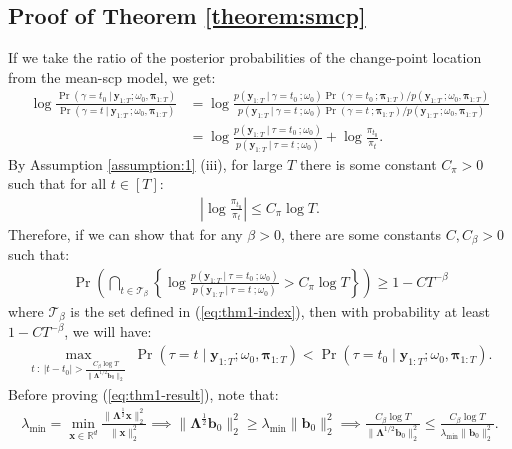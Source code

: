 \subsection{Proof of Theorem \ref{theorem:smcp}}
\label{app:localization-smcp}

If we take the ratio of the posterior probabilities of the change-point location from the mean-scp model, we get:
\begin{align*}
    \log \frac{\Pr(\gamma = t_0  \:|\: \mathbf{y}_{1:T} ; \omega_0,\boldsymbol{\pi}_{1:T})}{\Pr(\gamma = t  \:|\: \mathbf{y}_{1:T} \:; \omega_0,\boldsymbol{\pi}_{1:T})} &=  \log \frac{p(\mathbf{y}_{1:T} \:|\:\gamma = t_0 \:; \omega_0)\Pr(\gamma = t_0 \:; \boldsymbol{\pi}_{1:T})/ p(\mathbf{y}_{1:T}\:;\omega_0,\boldsymbol{\pi}_{1:T})}{p(\mathbf{y}_{1:T} \:|\:\gamma = t \:; \omega_0)\Pr(\gamma = t \:;\boldsymbol{\pi}_{1:T})/p(\mathbf{y}_{1:T}\:;\omega_0,\boldsymbol{\pi}_{1:T})} \tag{Bayes' rule} \\
    &= \log \frac{p(\mathbf{y}_{1:T} \:|\:\tau = t_0 \:; \omega_0)}{p(\mathbf{y}_{1:T} \:|\:\tau = t \:; \omega_0)} + \log \frac{\pi_{t_0}}{\pi_t}.
\end{align*}
By Assumption \ref{assumption:1} (iii), for large $T$ there is some constant $C_\pi > 0$ such that for all $t \in [T]$: 
\begin{align}\label{eq:thm1-prior-bd}
    \left|\log \frac{\pi_{t_0}}{\pi_t}\right| \leq C_\pi \log T.
\end{align}
Therefore, if we can show that for any $\beta > 0$, there are some constants $C,C_\beta > 0$ such that:
\begin{align}
    \Pr\left(\bigcap_{t\in\mathcal{T}_\beta}\left\{ \log \frac{p(\mathbf{y}_{1:T} \:|\:\tau = t_0 \:; \omega_0)}{p(\mathbf{y}_{1:T} \:|\:\tau = t \:; \omega_0)} > C_\pi \log T\right\}\right) \geq 1 - CT^{-\beta} \label{eq:thm1-result}
\end{align}
where $\mathcal{T}_\beta$ is the set defined in (\ref{eq:thm1-index}), then with probability at least $1 - CT^{-\beta}$, we will have:
\begin{align*}
    \max_{t\::\: |t - t_0| > \frac{C_\beta\log T}{\lVert\boldsymbol{\Lambda}^{1/2}\mathbf{b}_0\rVert_2}} \; \Pr(\tau = t  \;|\; \mathbf{y}_{1:T} ; \omega_0,\boldsymbol{\pi}_{1:T}) < \Pr(\tau = t_0  \;|\; \mathbf{y}_{1:T} ; \omega_0,\boldsymbol{\pi}_{1:T}).
\end{align*}
Before proving (\ref{eq:thm1-result}), note that: 
\begin{align*}
    \lambda_{\min} = \min_{\mathbf{x}\in\mathbb{R}^d}\frac{\lVert\boldsymbol{\Lambda}^{\frac{1}{2}}\mathbf{x}\rVert_2^2}{\lVert\mathbf{x}\rVert_2^2} \implies \lVert\boldsymbol{\Lambda}^{\frac{1}{2}} \mathbf{b}_0\rVert^2_2 \geq \lambda_{\min} \lVert \mathbf{b}_0\rVert^2_2 \implies \frac{C_\beta \log T}{\lVert \boldsymbol{\Lambda}^{1/2}\mathbf{b}_0\rVert_2^2} \leq 
    \frac{C_\beta \log T}{\lambda_{\min}\lVert\mathbf{b}_0\rVert_2^2}.
\end{align*}
